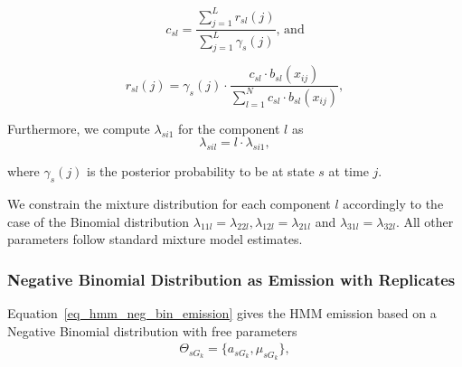 $$c_{sl} = \frac{\sum_{j=1}^L r_{sl}(j)}{\sum_{j=1}^L \gamma_s(j)} \text{, and}$$

$$r_{sl}(j) = \gamma_s(j) \cdot \frac{c_{sl} \cdot b_{sl}(x_{ij}) }{\sum_{l=1}^N c_{sl} \cdot b_{sl}(x_{ij})},$$

\noindent
Furthermore, we compute $\lambda_{si1}$ for the component $l$ as
$$\lambda_{sil} = l \cdot \lambda_{si1},$$

\noindent
where $\gamma_s(j)$ is the posterior probability to be at state $s$ at time $j$.

\noindent
We constrain the mixture distribution for each component $l$ accordingly to the case of the Binomial distribution $\lambda_{11l} = \lambda_{22l}, \lambda_{12l}=\lambda_{21l}$ and $\lambda_{31l}=\lambda_{32l}$.
All other parameters follow standard mixture model estimates.

% 
% 
% 

 

\subsubsection{Negative Binomial Distribution as Emission with Replicates}
Equation~\ref{eq_hmm_neg_bin_emission} gives the HMM emission based on a Negative Binomial distribution with free parameters
\begin{align*}
 \Theta_{sG_k} = \{a_{sG_k}, \mu_{sG_k}\},%
\end{align*}

